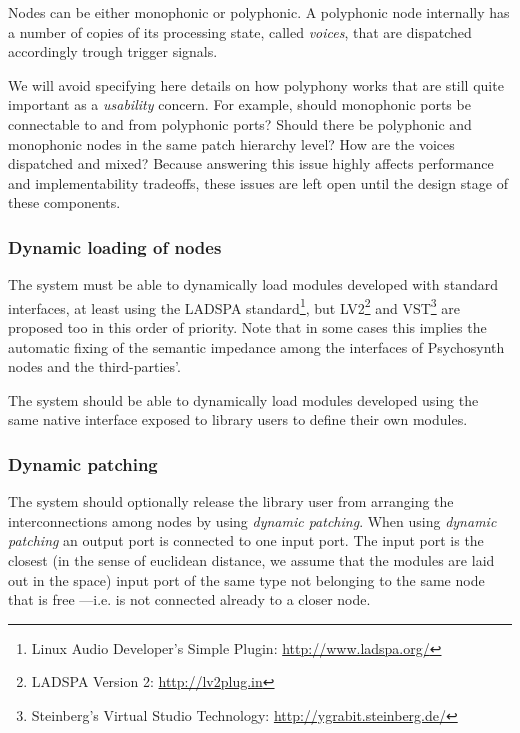 \begin{requirement}
\label{req:iter2-end}
Nodes can be either monophonic or polyphonic. A polyphonic node
internally has a number of copies of its processing state, called
\emph{voices}, that are dispatched accordingly trough trigger signals.
\end{requirement}

\begin{mynote}
We will avoid specifying here details on how polyphony works that are
still quite important as a \emph{usability} concern. For example,
should monophonic ports be connectable to and from polyphonic ports?
Should there be polyphonic and monophonic nodes in the same patch
hierarchy level? How are the voices dispatched and mixed? Because
answering this issue highly affects performance and implementability
tradeoffs, these issues are left open until the design stage of these
components.
\end{mynote}

\subsubsection{Dynamic loading of nodes}

\begin{requirement}
  \label{req:iter3-begin}
  The system must be able to dynamically load modules developed with
  standard interfaces, at least using the LADSPA
  standard\footnote{Linux Audio Developer's Simple Plugin:
    \url{http://www.ladspa.org/}}, but LV2\footnote{LADSPA Version 2:
    \url{http://lv2plug.in}} and VST\footnote{Steinberg's Virtual
    Studio Technology: \url{http://ygrabit.steinberg.de/}} are
  proposed too in this order of priority. Note that in some cases this
  implies the automatic fixing of the semantic impedance among the
  interfaces of Psychosynth nodes and the third-parties'.
\end{requirement}

\begin{requirement}
  The system should be able to dynamically load modules developed
  using the same native interface exposed to library users to define
  their own modules. 
\end{requirement}

\subsubsection{Dynamic patching}

\begin{requirement}
  The system should optionally release the library user from arranging
  the interconnections among nodes by using \emph{dynamic
    patching}. When using \emph{dynamic patching} an output port is
  connected to one input port. The input port is the closest (in the
  sense of euclidean distance, we assume that the modules are laid out
  in the space) input port of the same type not belonging to the same
  node that is free ---i.e. is not connected already to a closer node.
\end{requirement}


